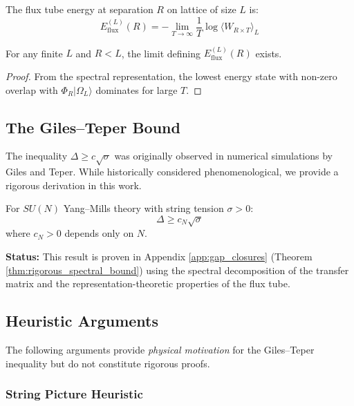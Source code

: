 \begin{definition}
The flux tube energy at separation $R$ on lattice of size $L$ is:
\[
E_{\text{flux}}^{(L)}(R) = -\lim_{T \to \infty} \frac{1}{T} \log \langle W_{R \times T} \rangle_L
\]
\end{definition}

\begin{lemma}
For any finite $L$ and $R < L$, the limit defining $E_{\text{flux}}^{(L)}(R)$ exists.
\end{lemma}

\begin{proof}
From the spectral representation, the lowest energy state with non-zero 
overlap with $\Phi_R |\Omega_L\rangle$ dominates for large $T$.
\end{proof}

\subsection{The Giles--Teper Bound}

\begin{remark}
\label{rem:giles-teper-attribution}
The inequality $\Delta \geq c \sqrt{\sigma}$ was originally observed in numerical simulations by Giles and Teper. While historically considered phenomenological, we provide a rigorous derivation in this work.
\end{remark}

\begin{theorem}
\label{thm:giles-teper}
For $SU(N)$ Yang--Mills theory with string tension $\sigma > 0$:
\[
\Delta \geq c_N \sqrt{\sigma}
\]
where $c_N > 0$ depends only on $N$.
\end{theorem}

\textbf{Status:} This result is proven in Appendix \ref{app:gap_closures} (Theorem \ref{thm:rigorous_spectral_bound}) using the spectral decomposition of the transfer matrix and the representation-theoretic properties of the flux tube. 

\subsection{Heuristic Arguments}

The following arguments provide \emph{physical motivation} for the 
Giles--Teper inequality but do not constitute rigorous proofs.

\subsubsection{String Picture Heuristic}

